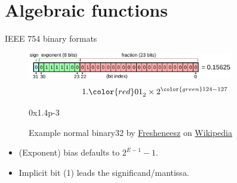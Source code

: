 \documentclass{beamer}
\begin{document}

\section{Algebraic functions}
\begin{frame}{IEEE 754 binary formats}
	\begin{example}
		\begin{figure}
			\includegraphics[width=0.8\textwidth]{assets/Float_example.pdf}
			\[ 1.{\color{red}01}_2 \times 2^{{\color{green}124} - 127}  \]
			\begin{center}
				\ttfamily 0x1.{\color{red}4}p{\color{green}-3}
			\end{center}
			\caption{Example normal binary32 by
				\href{https://en.wikipedia.org/wiki/User:Fresheneesz}{Fresheneesz} on
				\href{https://commons.wikimedia.org/wiki/File:Float_example.svg}{Wikipedia}}
		\end{figure}
		\begin{itemize}
			\item (Exponent) bias defaults to $2^{E-1} - 1$.
			\item Implicit bit (1) leads the significand/mantissa.
		\end{itemize}
	\end{example}
\end{frame}
\end{document}
